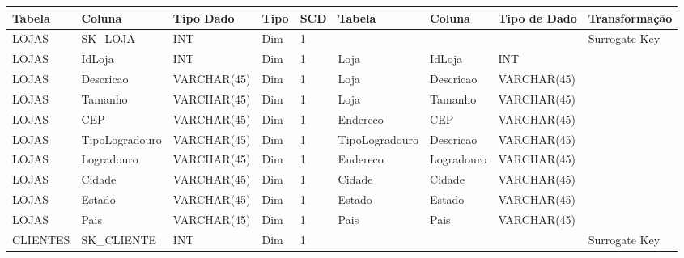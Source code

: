 \begin{landscape}
\begin{longtable}{l|l|l|l|l|l|l|l|l}
\hline 
{\scriptsize{}Tabela} & {\scriptsize{}Coluna} & {\scriptsize{}Tipo Dado} & {\scriptsize{}Tipo} & {\scriptsize{}SCD} & {\scriptsize{}Tabela} & {\scriptsize{}Coluna} & {\scriptsize{}Tipo de Dado} & {\scriptsize{}Transformação}\tabularnewline
\hline 
{\scriptsize{}LOJAS} & {\scriptsize{}SK\_LOJA} & {\scriptsize{}INT} & {\scriptsize{}Dim} & {\scriptsize{}1} &  &  &  & {\scriptsize{}Surrogate Key}\tabularnewline
{\scriptsize{}LOJAS} & {\scriptsize{}IdLoja} & {\scriptsize{}INT} & {\scriptsize{}Dim} & {\scriptsize{}1} & {\scriptsize{}Loja} & {\scriptsize{}IdLoja} & {\scriptsize{}INT} & \tabularnewline
{\scriptsize{}LOJAS} & {\scriptsize{}Descricao} & {\scriptsize{}VARCHAR(45)} & {\scriptsize{}Dim} & {\scriptsize{}1} & {\scriptsize{}Loja} & {\scriptsize{}Descricao} & {\scriptsize{}VARCHAR(45)} & \tabularnewline
{\scriptsize{}LOJAS} & {\scriptsize{}Tamanho} & {\scriptsize{}VARCHAR(45)} & {\scriptsize{}Dim} & {\scriptsize{}1} & {\scriptsize{}Loja} & {\scriptsize{}Tamanho} & {\scriptsize{}VARCHAR(45)} & \tabularnewline
{\scriptsize{}LOJAS} & {\scriptsize{}CEP} & {\scriptsize{}VARCHAR(45)} & {\scriptsize{}Dim} & {\scriptsize{}1} & {\scriptsize{}Endereco} & {\scriptsize{}CEP} & {\scriptsize{}VARCHAR(45)} & \tabularnewline
{\scriptsize{}LOJAS} & {\scriptsize{}TipoLogradouro} & {\scriptsize{}VARCHAR(45)} & {\scriptsize{}Dim} & {\scriptsize{}1} & {\scriptsize{}TipoLogradouro} & {\scriptsize{}Descricao} & {\scriptsize{}VARCHAR(45)} & \tabularnewline
{\scriptsize{}LOJAS} & {\scriptsize{}Logradouro} & {\scriptsize{}VARCHAR(45)} & {\scriptsize{}Dim} & {\scriptsize{}1} & {\scriptsize{}Endereco} & {\scriptsize{}Logradouro} & {\scriptsize{}VARCHAR(45)} & \tabularnewline
{\scriptsize{}LOJAS} & {\scriptsize{}Cidade} & {\scriptsize{}VARCHAR(45)} & {\scriptsize{}Dim} & {\scriptsize{}1} & {\scriptsize{}Cidade} & {\scriptsize{}Cidade} & {\scriptsize{}VARCHAR(45)} & \tabularnewline
{\scriptsize{}LOJAS} & {\scriptsize{}Estado} & {\scriptsize{}VARCHAR(45)} & {\scriptsize{}Dim} & {\scriptsize{}1} & {\scriptsize{}Estado} & {\scriptsize{}Estado} & {\scriptsize{}VARCHAR(45)} & \tabularnewline
{\scriptsize{}LOJAS} & {\scriptsize{}Pais} & {\scriptsize{}VARCHAR(45)} & {\scriptsize{}Dim} & {\scriptsize{}1} & {\scriptsize{}Pais} & {\scriptsize{}Pais} & {\scriptsize{}VARCHAR(45)} & \tabularnewline
{\scriptsize{}CLIENTES} & {\scriptsize{}SK\_CLIENTE} & {\scriptsize{}INT} & {\scriptsize{}Dim} & {\scriptsize{}1} &  &  &  & {\scriptsize{}Surrogate Key}\tabularnewline

\end{longtable}
\end{landscape}
